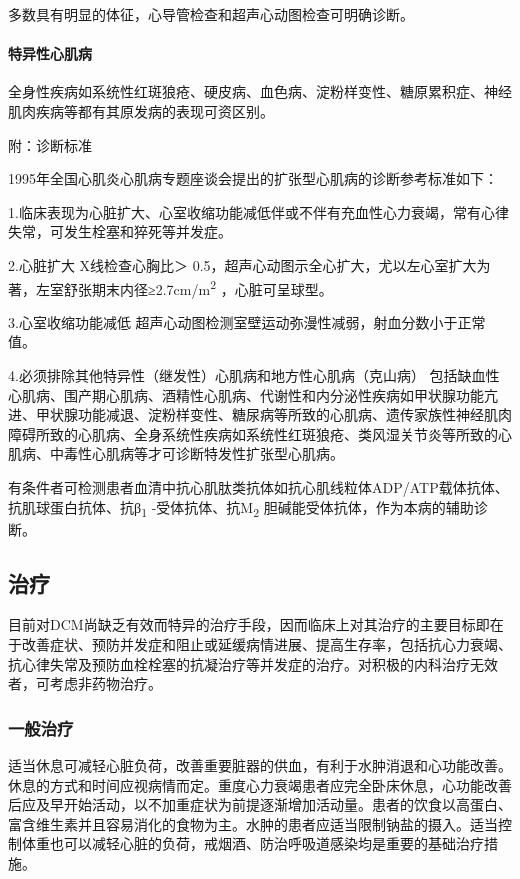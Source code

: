 多数具有明显的体征，心导管检查和超声心动图检查可明确诊断。

\paragraph{特异性心肌病}

全身性疾病如系统性红斑狼疮、硬皮病、血色病、淀粉样变性、糖原累积症、神经肌肉疾病等都有其原发病的表现可资区别。

\hypertarget{text00306.htmlux5cux23CHP10-6-1-2-4}{}
附：诊断标准

1995年全国心肌炎心肌病专题座谈会提出的扩张型心肌病的诊断参考标准如下：

1.临床表现为心脏扩大、心室收缩功能减低伴或不伴有充血性心力衰竭，常有心律失常，可发生栓塞和猝死等并发症。

2.心脏扩大 X线检查心胸比＞
0.5，超声心动图示全心扩大，尤以左心室扩大为著，左室舒张期末内径≥2.7cm/m\textsuperscript{2}
，心脏可呈球型。

3.心室收缩功能减低
超声心动图检测室壁运动弥漫性减弱，射血分数小于正常值。

4.必须排除其他特异性（继发性）心肌病和地方性心肌病（克山病）
包括缺血性心肌病、围产期心肌病、酒精性心肌病、代谢性和内分泌性疾病如甲状腺功能亢进、甲状腺功能减退、淀粉样变性、糖尿病等所致的心肌病、遗传家族性神经肌肉障碍所致的心肌病、全身系统性疾病如系统性红斑狼疮、类风湿关节炎等所致的心肌病、中毒性心肌病等才可诊断特发性扩张型心肌病。

有条件者可检测患者血清中抗心肌肽类抗体如抗心肌线粒体ADP/ATP载体抗体、抗肌球蛋白抗体、抗β\textsubscript{1}
-受体抗体、抗M\textsubscript{2} 胆碱能受体抗体，作为本病的辅助诊断。

\subsection{治疗}

目前对DCM尚缺乏有效而特异的治疗手段，因而临床上对其治疗的主要目标即在于改善症状、预防并发症和阻止或延缓病情进展、提高生存率，包括抗心力衰竭、抗心律失常及预防血栓栓塞的抗凝治疗等并发症的治疗。对积极的内科治疗无效者，可考虑非药物治疗。

\subsubsection{一般治疗}

适当休息可减轻心脏负荷，改善重要脏器的供血，有利于水肿消退和心功能改善。休息的方式和时间应视病情而定。重度心力衰竭患者应完全卧床休息，心功能改善后应及早开始活动，以不加重症状为前提逐渐增加活动量。患者的饮食以高蛋白、富含维生素并且容易消化的食物为主。水肿的患者应适当限制钠盐的摄入。适当控制体重也可以减轻心脏的负荷，戒烟酒、防治呼吸道感染均是重要的基础治疗措施。


